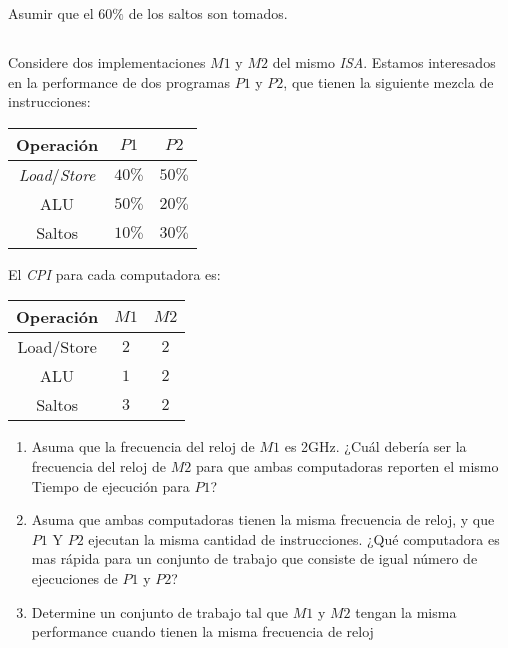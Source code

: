             Asumir que el $60\%$ de los saltos son tomados.

\subsection{}
            Considere dos implementaciones $M1$ y $M2$ del mismo \textit{ISA}. Estamos interesados en la performance de dos programas $P1$ y $P2$, que tienen 
            la siguiente mezcla de instrucciones: 
            
            \begin{center}
            \begin{tabular}{||c|c|c||}
            \hline
            Operación & $P1$ & $P2$ \\\hline
            \textit{Load}/\textit{Store} & $40\%$ & $50\%$ \\\hline
            ALU        & $50\%$ & $20\%$ \\\hline
            Saltos   & $10\%$ & $30\%$ \\\hline
            \end{tabular}
            \end{center}

            El \textit{CPI} para cada computadora es:
            \begin{center}
            \begin{tabular}{||c|c|c||}
            \hline
            Operación & $M1$ & $M2$ \\
            \hline
            Load/Store & $2$ & $2$ \\
            \hline
            ALU        & $1$ & $2$ \\
            \hline
            Saltos   & $3$ & $2$ \\
            \hline
            \end{tabular}
            \end{center}

            \begin{enumerate}
            \item Asuma que la frecuencia del reloj de $M1$ es 2GHz. ¿Cuál debería ser la frecuencia del reloj de $M2$ para que ambas
            computadoras reporten el mismo Tiempo de ejecución para $P1$?

            \item Asuma que ambas computadoras tienen la misma frecuencia de reloj, y que  $P1$ Y $P2$ ejecutan la misma cantidad de instrucciones.
            ¿Qué computadora es mas rápida para un conjunto de trabajo que consiste de igual número de ejecuciones de $P1$ y $P2$?

            \item Determine un conjunto de trabajo tal que $M1$ y $M2$ tengan la misma performance cuando tienen la misma frecuencia de reloj

            \end{enumerate}
            
